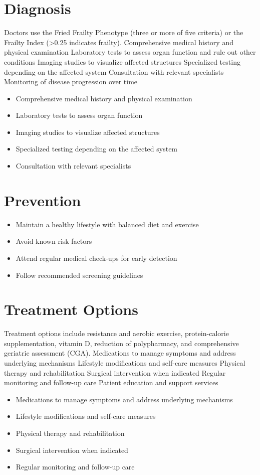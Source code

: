 \section{Diagnosis}
Doctors use the Fried Frailty Phenotype (three or more of five criteria) or the Frailty Index (>0.25 indicates frailty). Comprehensive medical history and physical examination Laboratory tests to assess organ function and rule out other conditions Imaging studies to visualize affected structures Specialized testing depending on the affected system Consultation with relevant specialists Monitoring of disease progression over time

\begin{itemize}[noitemsep]
  \item Comprehensive medical history and physical examination
  \item Laboratory tests to assess organ function
  \item Imaging studies to visualize affected structures
  \item Specialized testing depending on the affected system
  \item Consultation with relevant specialists
\end{itemize}
\section{Prevention}
\begin{itemize}[noitemsep]
  \item Maintain a healthy lifestyle with balanced diet and exercise
  \item Avoid known risk factors
  \item Attend regular medical check-ups for early detection
  \item Follow recommended screening guidelines
\end{itemize}
\section{Treatment Options}
Treatment options include resistance and aerobic exercise, protein-calorie supplementation, vitamin D, reduction of polypharmacy, and comprehensive geriatric assessment (CGA). Medications to manage symptoms and address underlying mechanisms Lifestyle modifications and self-care measures Physical therapy and rehabilitation Surgical intervention when indicated Regular monitoring and follow-up care Patient education and support services

\begin{itemize}[noitemsep]
  \item Medications to manage symptoms and address underlying mechanisms
  \item Lifestyle modifications and self-care measures
  \item Physical therapy and rehabilitation
  \item Surgical intervention when indicated
  \item Regular monitoring and follow-up care
\end{itemize}
